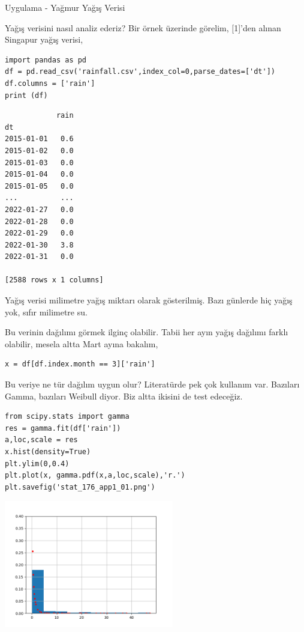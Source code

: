 \documentclass[12pt,fleqn]{article}\usepackage{../../common}
\begin{document}
Uygulama - Yağmur Yağış Verisi

Yağış verisini nasıl analiz ederiz? Bir örnek üzerinde görelim, [1]'den alınan
Singapur yağış verisi,

\begin{verbatim}
import pandas as pd
df = pd.read_csv('rainfall.csv',index_col=0,parse_dates=['dt'])
df.columns = ['rain']
print (df)
\end{verbatim}

\begin{verbatim}
            rain
dt              
2015-01-01   0.6
2015-01-02   0.0
2015-01-03   0.0
2015-01-04   0.0
2015-01-05   0.0
...          ...
2022-01-27   0.0
2022-01-28   0.0
2022-01-29   0.0
2022-01-30   3.8
2022-01-31   0.0

[2588 rows x 1 columns]
\end{verbatim}

Yağış verisi milimetre yağış miktarı olarak gösterilmiş. Bazı günlerde hiç yağış
yok, sıfır milimetre su.

Bu verinin dağılımı görmek ilginç olabilir. Tabii her ayın yağış dağılımı
farklı olabilir, mesela altta Mart ayına bakalım,

\begin{verbatim}
x = df[df.index.month == 3]['rain']
\end{verbatim}

Bu veriye ne tür dağılım uygun olur? Literatürde pek çok kullanım var.  Bazıları
Gamma, bazıları Weibull diyor. Biz altta ikisini de test edeceğiz.

\begin{verbatim}
from scipy.stats import gamma
res = gamma.fit(df['rain'])
a,loc,scale = res  
x.hist(density=True)
plt.ylim(0,0.4)
plt.plot(x, gamma.pdf(x,a,loc,scale),'r.')
plt.savefig('stat_176_app1_01.png')
\end{verbatim}

\includegraphics[width=20em]{stat_176_app1_01.png}
\end{document}
